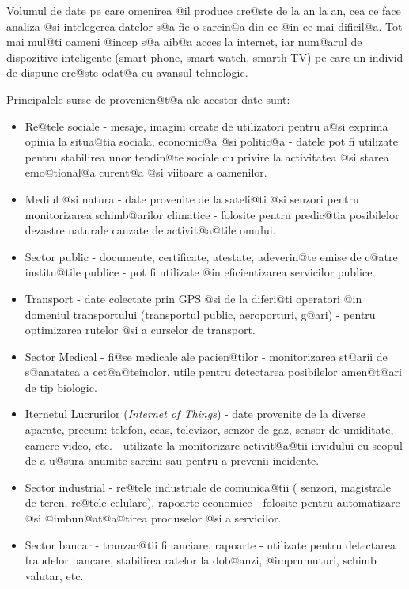 Volumul de date pe care omenirea @il produce cre@ste de la an la an, cea ce face  analiza @si intelegerea datelor s@a fie o sarcin@a din ce @in ce mai dificil@a. Tot mai mul@ti oameni @incep s@a aib@a acces la internet, iar num@arul de dispozitive inteligente (smart phone, smart watch, smarth TV) pe care un individ de dispune cre@ste odat@a cu avansul tehnologic.

Principalele surse de provenien@t@a ale acestor date sunt:
\begin{itemize}
	\item Re@tele sociale - mesaje, imagini create de utilizatori pentru a@si exprima opinia la situa@tia sociala, economic@a @si politic@a - datele pot fi utilizate pentru stabilirea unor tendin@te sociale cu privire la activitatea @si starea emo@tional@a curent@a @si viitoare a oamenilor.
	\item Mediul @si natura - date provenite de la sateli@ti @si senzori pentru monitorizarea schimb@arilor climatice - folosite pentru predic@tia posibilelor dezastre naturale cauzate de activit@a@tile omului.
	\item Sector public - documente, certificate, atestate, adeverin@te emise de c@atre institu@tile publice - pot fi utilizate @in eficientizarea servicilor publice.
	\item Transport - date colectate prin GPS @si de la diferi@ti operatori @in domeniul transportului (transportul public, aeroporturi, g@ari) - pentru optimizarea rutelor @si a curselor de transport.
	\item Sector Medical - fi@se medicale ale pacien@tilor - monitorizarea st@arii de s@anatatea a cet@a@teinolor, utile pentru detectarea posibilelor amen@t@ari de tip biologic.
	\item Iternetul Lucrurilor ({\sl Internet of Things}) - date provenite de la diverse aparate, precum: telefon, ceas, televizor, senzor de gaz, sensor de umiditate, camere video, etc. - utilizate la monitorizare activit@a@tii invidului cu scopul de a u@sura anumite sarcini sau pentru a prevenii incidente.
	\item Sector industrial - re@tele industriale de comunica@tii ( senzori, magistrale de teren, re@tele celulare), rapoarte economice - folosite pentru automatizare @si @imbun@at@a@tirea produselor @si a servicilor. 
	\item Sector bancar - tranzac@tii financiare, rapoarte - utilizate pentru detectarea fraudelor bancare, stabilirea ratelor la dob@anzi, @imprumuturi, schimb valutar, etc.
\end{itemize}

